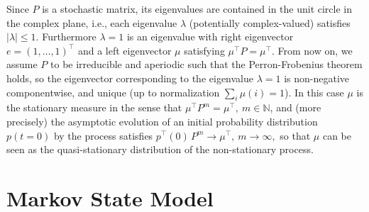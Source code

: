 \documentclass[journal=jctcce,manuscript=article]{achemso}
\newcommand{\vect}[1]{#1}
\newcommand{\mymu}{\mu}
\begin{document}
Since $P$ is a stochastic matrix, its eigenvalues are contained in the unit circle in
the complex plane, i.e., each eigenvalue $\lambda$ (potentially complex-valued)
satisfies $|\lambda|\le 1$. Furthermore $\lambda=1$ is an
eigenvalue with right eigenvector $\vect e=(1,\ldots,1)^{\top}$ and a left eigenvector $\mymu$
satisfying
$\mymu^{\top}P=\mymu^{\top}$.
From now on, we assume $P$ to be irreducible and aperiodic such that the Perron-Frobenius theorem holds, so the eigenvector corresponding to the eigenvalue $\lambda=1$ is  non-negative componentwise, and unique (up to normalization $\sum_i\mu(i)=1$). In this case $\mymu$ is the stationary measure in the sense that
$
 \mymu^{\top} P^m = \mymu^{\top},\ m\in\mathbb N
$,
and (more precisely) the asymptotic evolution of an initial probability distribution $\vect p(t=0)$ by the process satisfies
$
\vect p^{\top}(0)\,P^m \to \mymu^{\top},\ m\to\infty,
$
so that $\mymu$ can be seen as the quasi-stationary distribution of the non-stationary process.



\section{Markov State Model}
\label{sec:build-msm}
\end{document}
